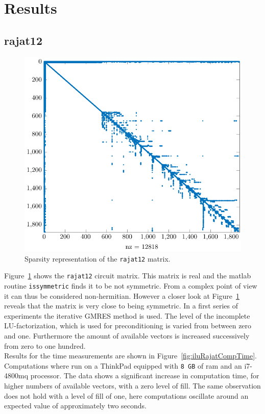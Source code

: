 \section{Results}

\subsection{rajat12}
\begin{figure}
\centering
\includegraphics[scale=0.8]{../src/figure/rajat12.pdf}
\caption{Sparsity representation of the \texttt{rajat12} matrix.}
\label{fig:rajat12}
\end{figure}
Figure~\ref{fig:rajat12} shows the \texttt{rajat12} circuit matrix. This matrix is real and the matlab routine \texttt{issymmetric} finds it to be not symmetric. From a complex point of view it can thus be considered non-hermitian. However a closer look at Figure~\ref{fig:rajat12} reveals that the matrix is very close to being symmetric. In a first series of experiments the iterative GMRES method is used. The level of the incomplete LU-factorization, which is used for preconditioning is varied from between zero and one. Furthermore the amount of available vectors is increased successively from zero to one hundred. \\
Results for the time measurements are shown in Figure~\ref{fig:iluRajatCompTime}. Computations where run on a ThinkPad equipped with \texttt{8 GB} of ram and an i7-4800mq processor. The data shows a significant increase in computation time, for higher numbers of available vectors, with a zero level of fill. The same observation does not hold with a level of fill of one, here computations oscillate around an expected value of approximately two seconds. \\
